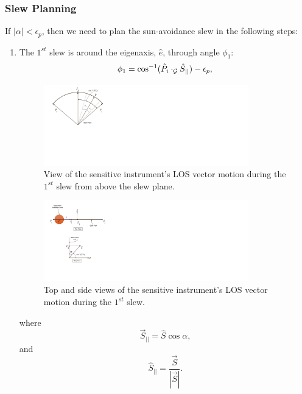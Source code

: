 \documentclass[journal ]{new-aiaa}
\begin{document}
	\subsubsection{Slew Planning}
	If $|\alpha|<\epsilon_p$, then we need to plan the sun-avoidance slew in the following steps: 
	\begin{enumerate}
		\item The $1^{st}$ slew is around the eigenaxis, $\hat{e}$, through angle $\phi_1$:
		\begin{equation}\label{phi1_1}
		\phi_1 = \cos^{-1}(\hat{P}_i\cdot_\mathcal{G}\hat{S}_{||})-\epsilon_p,\\
		\end{equation}
		\begin{figure}[H]
			\begin{center}
				\includegraphics[width=3.5in]{./Figures/SVAS_1r_modified}
				\caption{View of the sensitive instrument's LOS vector motion during the $1^{st}$ slew from above the slew plane.}
			\end{center}
		\end{figure}
		\begin{figure}[h!]
			\centering
				\includegraphics[width=3.5in]{./Figures/SVAS_1rb_modified}
				\caption{Top and side views of the sensitive instrument's LOS vector motion during the $1^{st}$ slew.}
		\end{figure}
		where 
		\begin{equation}\label{Sbar}
		\vec{S}_{||}=\hat{S}\cos\alpha, 
		\end{equation}
		and
		\begin{equation}\label{Shat}
		\hat{S}_{||}=\frac{\vec{S}}{|\vec{S}|}.
		\end{equation}
	

\end{enumerate}
\end{document}

